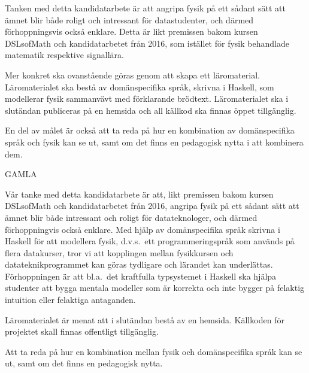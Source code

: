 \begin{draft}

\iffalse
Målet med projektet är att skapa domänspecifika språk för fysik samt ett   
tillhörande läromaterial. Läromaterialets syfte är att beskriva fysiken och
dess koppling till de domänspecifika språken projektgruppen utvecklat.

Nedan beskrivs hur att vi vill väcka intresse för fysik hos
datateknologer genom att presentera fysik ur ett annat perspektiv.
\fi



Tanken med detta kandidatarbete är att angripa fysik på ett sådant sätt att ämnet blir både roligt och intressant för datastudenter, och därmed förhoppningsvis också enklare. Detta är likt premissen bakom kursen DSLsofMath och kandidatarbetet från 2016, som istället för fysik behandlade matematik respektive signallära.

Mer konkret ska ovanstående göras genom att skapa ett läromaterial. Läromaterialet ska bestå av domänspecifika språk, skrivna i Haskell, som modellerar fysik sammanvävt med förklarande brödtext. Läromaterialet ska i slutändan publiceras på en hemsida och all källkod ska finnas öppet tillgänglig.

En del av målet är också att ta reda på hur en kombination av domänspecifika språk och fysik kan se ut, samt om det finns en pedagogisk nytta i att kombinera dem.

\iffalse
GAMLA

Vår tanke med detta kandidatarbete är att, likt premissen bakom kursen DSLsofMath
och kandidatarbetet från 2016, angripa fysik på ett sådant sätt att ämnet blir både
intressant och roligt för datateknologer, och därmed förhoppningvis
också enklare. Med hjälp av domänspecifika språk skrivna i Haskell för att
modellera fysik, d.v.s.\ ett programmeringspråk som används på flera
datakurser, tror vi att kopplingen mellan fysikkursen och
datateknikprogrammet kan göras tydligare och lärandet kan underlättas.
Förhoppningen är att bl.a.\ det kraftfulla typsystemet i Haskell ska
hjälpa studenter att bygga mentala modeller som är korrekta och inte
bygger på felaktig intuition eller felaktiga antaganden.

Läromaterialet är menat att i slutändan bestå av en hemsida. Källkoden för projektet
skall finnas offentligt tillgänglig.

Att ta reda på hur en kombination mellan fysik och domänspecifika språk kan se ut, samt om det finns en pedagogisk nytta.   %


\end{draft}
